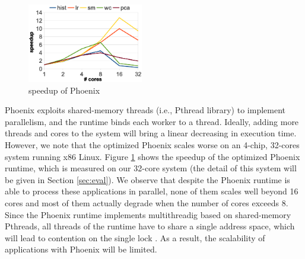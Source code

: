 



\begin{figure}[!h!t]  
	\centering
	\includegraphics[width=0.45\textwidth]{eps/phoenix_speedup.eps}
	\caption{speedup of Phoenix}
	\label{fig:phoenix:speedup}
\end{figure}

Phoenix exploits shared-memory threads (i.e., Pthread library) to implement parallelism, and the runtime binds each worker to a thread.
Ideally, adding more threads and cores to the system will bring a linear decreasing in execution time.
However, we note that the optimized Phoenix \cite{yoo2009phoenix2}  scales worse on an 4-chip, 32-cores system running x86 Linux.
Figure \ref{fig:phoenix:speedup} shows the speedup of the optimized Phoenix runtime, which is measured on our 32-core system (the detail of this system will be given in Section \ref{sec:eval}). 
We observe that despite the Phoenix runtime is able to process these applications in parallel, none of them scales well beyond 16 cores and most of them actually degrade when the number of cores exceeds 8.
Since the Phoenix runtime implements multithreadig based on shared-memory Pthreads, all threads of the runtime have to share a single address space, which will lead to contention on the single lock \cite{Clements2013RadixVM}.
As a result, the scalability of applications with Phoenix will be limited. 
 

